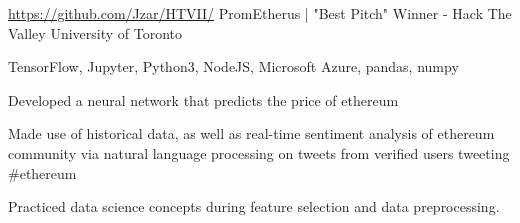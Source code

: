 

\begin{cventries}

\vspace{-1mm}
  \cventry
    {\url{https://github.com/Jzar/HTVII/}} %
    {PromEtherus | "Best Pitch" Winner - Hack The Valley } %
    {University of Toronto} %
    {} %
    {
      \begin{cvitems} %
        \item {TensorFlow, Jupyter, Python3, NodeJS, Microsoft Azure, pandas, numpy}
        \item {Developed a neural network that predicts the price of ethereum}
	\item{ Made use of historical data, as well as real-time sentiment analysis of ethereum community via natural language processing on tweets from verified 
users tweeting \#ethereum}
        \item {Practiced data science concepts during feature selection and data preprocessing. }
      \end{cvitems}
    }


\end{cventries}
